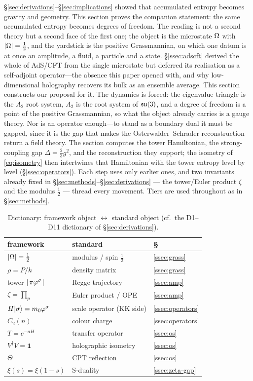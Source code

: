 \S\ref*{sec:derivations}--\S\ref*{sec:implications} showed that accumulated entropy becomes
gravity and geometry. This section proves the companion statement: the same accumulated entropy
becomes degrees of freedom. The reading is not a second theory but a second face of the first
one; the object is the microstate $\Omega$ with $\lvert\Omega\rvert=\tfrac12$, and the yardstick is the
positive Grassmannian, on which one datum is at once an amplitude, a fluid, a particle and a
state. \S\ref*{ssec:adscft} derived the whole of AdS/CFT from the single microstate but deferred its
realisation as a self-adjoint operator---the absence this paper opened with, and why
low-dimensional holography recovers its bulk as an ensemble average. This section constructs
our proposal for it. The dynamics is forced: the eigenvalue triangle is the $A_2$ root system,
$A_2$ is the root system of $\mathfrak{su}(3)$, and a degree of freedom is a point of the positive
Grassmannian, so what the object already carries is a gauge theory. Nor is an operator
enough---to stand as a boundary dual it must be gapped, since it is the gap that makes the
Osterwalder--Schrader reconstruction return a field theory. The section computes the tower
Hamiltonian, the strong-coupling gap $\Delta=\tfrac23g^{2}$, and the reconstruction they
support; the isometry of \eqref{eq:isometry} then intertwines that Hamiltonian with the tower
entropy level by level (\S\ref{ssec:operators}). Each step uses only earlier ones, and two
invariants already fixed in \S\ref*{sec:methods}--\S\ref*{sec:derivations}
--- the tower/Euler product $\zeta$ and the modulus $\tfrac12$ --- thread every movement. Tiers are
used throughout as in \S\ref{sec:methods}.

\begin{table}[htb]\centering\footnotesize
\caption{Dictionary: framework object $\leftrightarrow$ standard object (cf.\ the D1--D11 dictionary of \S\ref*{sec:derivations}).}\label{tab:dict}
\begin{tabular}{lll}\hline
framework & standard & \S\\\hline
$\lvert\Omega\rvert=\tfrac12$ & modulus / spin $\tfrac12$ & \ref{ssec:grass}\\
$\rho=P/k$ & density matrix & \ref{ssec:grass}\\
tower $\lfloor\pi\varphi^\sigma\rfloor$ & Regge trajectory & \ref{ssec:amp}\\
$\zeta=\prod_p$ & Euler product / OPE & \ref{ssec:amp}\\
$H\lvert\sigma\rangle=m_0\varphi^\sigma$ & scale operator (KK side) & \ref{ssec:operators}\\
$C_2(n)$ & colour charge & \ref{ssec:operators}\\
$T=e^{-aH}$ & transfer operator & \ref{ssec:os}\\
$V^\dagger V=\mathbf1$ & holographic isometry & \ref{ssec:os}\\
$\Theta$ & CPT reflection & \ref{ssec:os}\\
$\xi(s)=\xi(1-s)$ & S-duality & \ref{ssec:zeta-gap}\\\hline
\end{tabular}\end{table}

